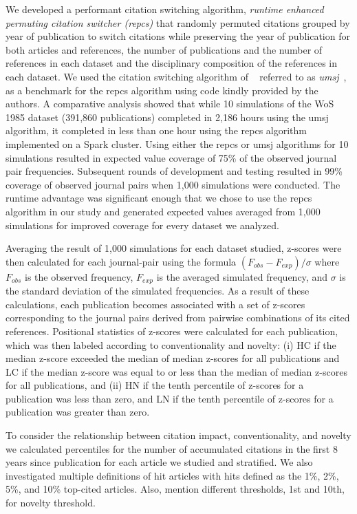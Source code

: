 \documentclass[NETN]{stjour}
\begin{document}
We developed a performant citation switching algorithm, \emph{runtime enhanced permuting citation switcher (repcs)} that randomly permuted citations grouped by year of publication to switch citations while preserving the year of publication for both articles and references, the number of publications and the number of references in each dataset and the disciplinary composition of the references in each dataset. We used the citation switching algorithm of ~\cite{uzzi_atypical_2013} referred to as \emph{umsj}~\citep{boyack_vs_uzzi_2014}, as a benchmark for the repcs algorithm using code kindly provided by the authors. A comparative analysis showed that while 10 simulations of the WoS 1985 dataset (391,860 publications) completed in 2,186 hours using the umsj algorithm, it completed in less than one hour using the repcs algorithm implemented on a Spark cluster. Using either the repcs or umsj algorithms for 10 simulations resulted in expected value coverage of 75\% of the observed journal pair frequencies. Subsequent rounds of development and testing resulted in 99\% coverage of observed journal pairs when 1,000 simulations were conducted. The runtime advantage was significant enough that we chose to use the repcs algorithm in our study  and generated expected values averaged from 1,000 simulations for improved coverage for every dataset we analyzed. 

Averaging the result of 1,000 simulations for each dataset studied, z-scores were then calculated for each journal-pair using the formula $(F_{obs} - F_{exp})/\sigma$ where $F_{obs}$ is the observed frequency, $F_{exp}$ is the averaged simulated frequency, and $\sigma$ is the standard deviation of the simulated frequencies. As a result of these calculations, each publication becomes associated with a set of z-scores corresponding to the journal pairs derived from pairwise combinations of its cited references. Positional statistics of z-scores were calculated for each publication, which was then labeled according to conventionality and novelty: (i) HC if the median z-score exceeded the median of median z-scores for all publications and LC if the median z-score was equal to or less than the median of median z-scores for all publications, and (ii) HN if the tenth percentile of z-scores for a publication was less than zero, and LN if the tenth percentile of z-scores for a publication was greater than zero.  

To consider the relationship between citation impact, conventionality, and novelty we calculated percentiles for the number of accumulated citations in the first 8 years since publication for each article we studied and stratified. We also investigated multiple definitions of hit articles with hits defined as the 1\%, 2\%, 5\%, and 10\% top-cited articles.  Also, mention different thresholds, 1st and 10th, for novelty threshold.
\end{document}

